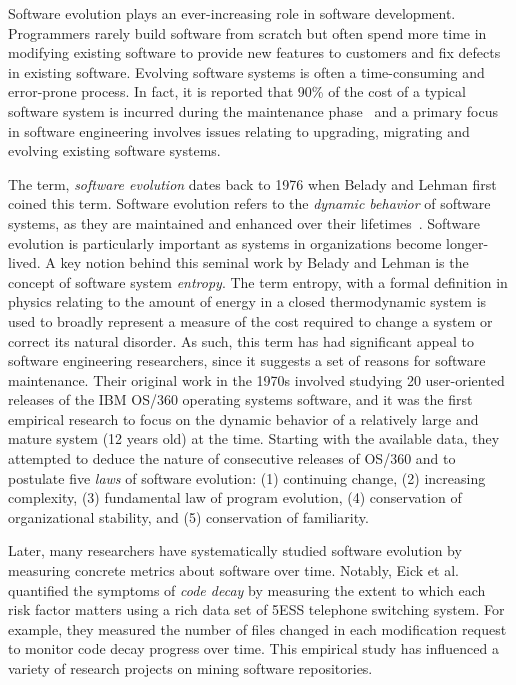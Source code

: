 Software evolution plays an ever-increasing role in software development. Programmers rarely build software from scratch but often spend more time in modifying existing software to provide new features to customers and fix defects in existing software.  Evolving software systems is often a time-consuming and error-prone process. In fact, it is reported that 90\% of the cost of a typical software system is incurred during the maintenance phase~\cite{Madhavji2006:evolution} and a primary focus in software engineering involves issues relating to upgrading, migrating and evolving existing software systems. 

The term, {\em software evolution} dates back to 1976 when Belady and Lehman first coined this term. Software evolution refers to the {\em dynamic behavior} of software systems, as they are maintained and enhanced over their lifetimes~\cite{Belady1976:ModelEvolution}. Software evolution is particularly important as systems in organizations become longer-lived. %
A key notion behind this seminal work by Belady and Lehman is the concept of software system {\em entropy}. The term entropy, with a formal definition in physics relating to the amount of energy in a closed thermodynamic system is used to broadly represent a measure of the cost required to change a system or correct its natural disorder. As such, this term has had significant appeal to software engineering researchers, since it suggests a set of reasons for software maintenance. Their original work in the 1970s involved studying 20 user-oriented releases of the IBM OS/360 operating systems software, and it was the first empirical research to focus on the dynamic behavior of a relatively large and mature system (12 years old) at the time. Starting with the available data, they attempted to deduce the nature of consecutive releases of OS/360 and to postulate five {\em laws} of software evolution: (1) continuing change, (2) increasing complexity, (3) fundamental law of program evolution, (4) conservation of organizational stability, and (5) conservation of familiarity. 

Later, many researchers have systematically studied software evolution by measuring concrete metrics about software over time. 
Notably, Eick et al.\cite{Eick2001:CodeDecay} quantified the symptoms of {\em code decay} by measuring the extent to which each risk factor matters using a rich data set of 5ESS telephone switching system. For example, they measured the number of files changed in each modification request to monitor code decay progress over time. This empirical study has influenced a variety of research projects on mining software repositories.  %


